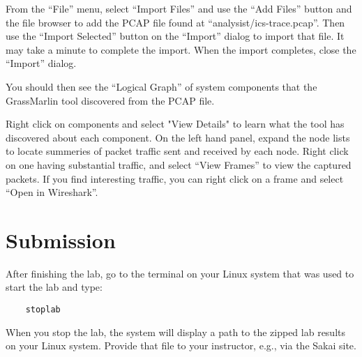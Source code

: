 From the ``File'' menu, select ``Import Files'' and use the ``Add Files'' button and the file
browser to add the PCAP file found at ``analysist/ics-trace.pcap''.  Then use the ``Import Selected'' button
on the ``Import'' dialog to import that file.  It may take a minute to complete the import.  When the import
completes, close the ``Import'' dialog.

You should then see the ``Logical Graph'' of system components that the GrassMarlin tool discovered from the
PCAP file.  

Right click on components and select "View Details" to learn what the tool has discovered about each component.
On the left hand panel, expand the node lists to locate summeries of packet traffic sent and received by
each node.  Right click on one having substantial traffic, and select ``View Frames'' to view the captured packets.
If you find interesting traffic, you can right click on a frame and select ``Open in Wireshark''.

\section{Submission}
After finishing the lab, go to the terminal on your Linux system that was used to start the lab and type:
\begin{verbatim}
    stoplab 
\end{verbatim}
When you stop the lab, the system will display a path to the zipped lab results on your Linux system.  Provide that file to 
your instructor, e.g., via the Sakai site.

\copyrightnotice


